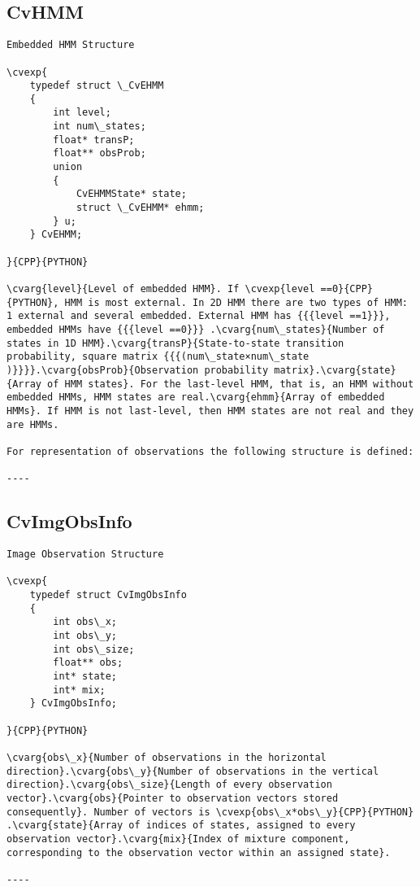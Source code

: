 \subsection{CvHMM}
\begin{verbatim}
Embedded HMM Structure

\cvexp{
    typedef struct \_CvEHMM
    {
        int level;
        int num\_states;
        float* transP;
        float** obsProb;
        union
        {
            CvEHMMState* state;
            struct \_CvEHMM* ehmm;
        } u;
    } CvEHMM;

}{CPP}{PYTHON}

\cvarg{level}{Level of embedded HMM}. If \cvexp{level ==0}{CPP}{PYTHON}, HMM is most external. In 2D HMM there are two types of HMM: 1 external and several embedded. External HMM has {{{level ==1}}}, embedded HMMs have {{{level ==0}}} .\cvarg{num\_states}{Number of states in 1D HMM}.\cvarg{transP}{State-to-state transition probability, square matrix {{{(num\_state×num\_state )}}}}.\cvarg{obsProb}{Observation probability matrix}.\cvarg{state}{Array of HMM states}. For the last-level HMM, that is, an HMM without embedded HMMs, HMM states are real.\cvarg{ehmm}{Array of embedded HMMs}. If HMM is not last-level, then HMM states are not real and they are HMMs.

For representation of observations the following structure is defined:

----
\end{verbatim}
\subsection{CvImgObsInfo}
\begin{verbatim}
Image Observation Structure

\cvexp{
    typedef struct CvImgObsInfo
    {
        int obs\_x;
        int obs\_y;
        int obs\_size;
        float** obs;
        int* state;
        int* mix;
    } CvImgObsInfo;

}{CPP}{PYTHON}

\cvarg{obs\_x}{Number of observations in the horizontal direction}.\cvarg{obs\_y}{Number of observations in the vertical direction}.\cvarg{obs\_size}{Length of every observation vector}.\cvarg{obs}{Pointer to observation vectors stored consequently}. Number of vectors is \cvexp{obs\_x*obs\_y}{CPP}{PYTHON} .\cvarg{state}{Array of indices of states, assigned to every observation vector}.\cvarg{mix}{Index of mixture component, corresponding to the observation vector within an assigned state}.

----
\end{verbatim}
